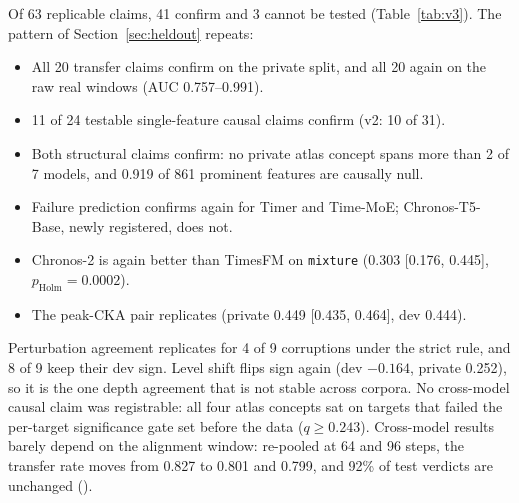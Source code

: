 Of 63 replicable claims, 41 confirm and 3 cannot be tested (Table~\ref{tab:v3}). The pattern of Section~\ref{sec:heldout}
repeats:
\begin{itemize}
  \item All 20 transfer claims confirm on the private split, and all 20 again on the raw real windows (AUC 0.757--0.991).
  \item 11 of 24 testable single-feature causal claims confirm (v2: 10 of 31).
  \item Both structural claims confirm: no private atlas concept spans more than 2 of 7 models, and 0.919 of 861
    prominent features are causally null.
  \item Failure prediction confirms again for Timer and Time-MoE; Chronos-T5-Base, newly registered, does not.
  \item Chronos-2 is again better than TimesFM on \texttt{mixture} (0.303 [0.176, 0.445], $p_{\text{Holm}}=0.0002$).
  \item The peak-CKA pair replicates (private 0.449 [0.435, 0.464], dev 0.444).
\end{itemize}
Perturbation agreement replicates for 4 of 9 corruptions under the strict rule, and 8 of 9 keep their dev sign. Level shift
flips sign again (dev $-0.164$, private 0.252), so it is the one depth agreement that is not stable across corpora. No
cross-model causal claim was registrable: all four atlas concepts sat on targets that failed the per-target significance
gate set before the data ($q\ge0.243$). Cross-model results barely depend on the alignment window: re-pooled at 64 and 96
steps, the transfer rate moves from 0.827 to 0.801 and 0.799, and 92\% of test verdicts are unchanged ().

